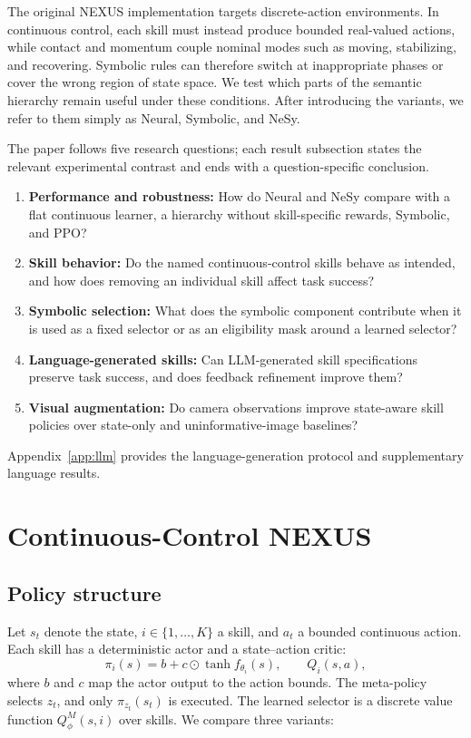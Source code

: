 \documentclass[conference,letterpaper,10pt]{IEEEtran}
\begin{document}
The original NEXUS implementation targets discrete-action environments. In continuous control, each skill must instead produce bounded real-valued actions, while contact and momentum couple nominal modes such as moving, stabilizing, and recovering. Symbolic rules can therefore switch at inappropriate phases or cover the wrong region of state space. We test which parts of the semantic hierarchy remain useful under these conditions. After introducing the variants, we refer to them simply as Neural, Symbolic, and NeSy.

The paper follows five research questions; each result subsection states the relevant experimental contrast and ends with a question-specific conclusion.
\begin{enumerate}
\item[\textbf{Q1.}] \textbf{Performance and robustness:} How do Neural and NeSy compare with a flat continuous learner, a hierarchy without skill-specific rewards, Symbolic, and PPO?
\item[\textbf{Q2.}] \textbf{Skill behavior:} Do the named continuous-control skills behave as intended, and how does removing an individual skill affect task success?
\item[\textbf{Q3.}] \textbf{Symbolic selection:} What does the symbolic component contribute when it is used as a fixed selector or as an eligibility mask around a learned selector?
\item[\textbf{Q4.}] \textbf{Language-generated skills:} Can LLM-generated skill specifications preserve task success, and does feedback refinement improve them?
\item[\textbf{Q5.}] \textbf{Visual augmentation:} Do camera observations improve state-aware skill policies over state-only and uninformative-image baselines?
\end{enumerate}

Appendix~\ref{app:llm} provides the language-generation protocol and supplementary language results.

\section{Continuous-Control NEXUS}
\subsection{Policy structure}
Let $s_t$ denote the state, $i\in\{1,\ldots,K\}$ a skill, and $a_t$ a bounded continuous action. Each skill has a deterministic actor and a state--action critic:
\begin{equation}
\pi_i(s)=b+c\odot\tanh f_{\theta_i}(s),\qquad Q_i(s,a),
\label{eq:actor}
\end{equation}
where $b$ and $c$ map the actor output to the action bounds. The meta-policy selects $z_t$, and only $\pi_{z_t}(s_t)$ is executed. The learned selector is a discrete value function $Q^M_\phi(s,i)$ over skills. We compare three variants:
\end{document}

